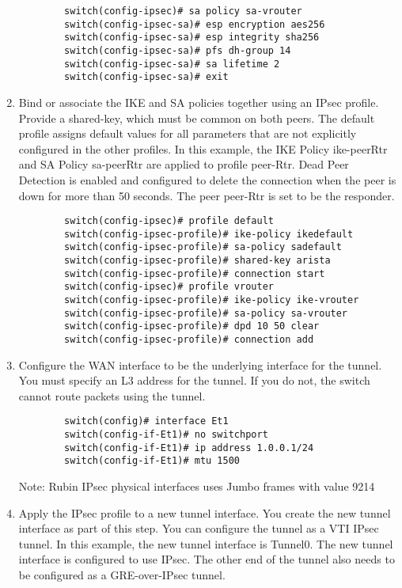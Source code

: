 \begin{enumerate}
        \begin{lstlisting}
        switch(config-ipsec)# sa policy sa-vrouter  
        switch(config-ipsec-sa)# esp encryption aes256  
        switch(config-ipsec-sa)# esp integrity sha256  
        switch(config-ipsec-sa)# pfs dh-group 14  
        switch(config-ipsec-sa)# sa lifetime 2  
        switch(config-ipsec-sa)# exit
        \end{lstlisting}
\item Bind or associate the IKE and SA policies together using an IPsec profile. Provide a shared-key, which must be common on both peers. The default profile assigns default values for all parameters that are not explicitly configured in the other profiles. In this example, the IKE Policy ike-peerRtr and SA Policy sa-peerRtr are applied to profile peer-Rtr. Dead Peer Detection is enabled and configured to delete the connection when the peer is down for more than 50 seconds. The peer peer-Rtr is set to be the responder.
        \begin{lstlisting}
        switch(config-ipsec)# profile default
        switch(config-ipsec-profile)# ike-policy ikedefault
        switch(config-ipsec-profile)# sa-policy sadefault
        switch(config-ipsec-profile)# shared-key arista
        switch(config-ipsec-profile)# connection start
        switch(config-ipsec)# profile vrouter
        switch(config-ipsec-profile)# ike-policy ike-vrouter
        switch(config-ipsec-profile)# sa-policy sa-vrouter
        switch(config-ipsec-profile)# dpd 10 50 clear
        switch(config-ipsec-profile)# connection add
        \end{lstlisting}
\item Configure the WAN interface to be the underlying interface for the tunnel. You must specify an L3 address for the tunnel. If you do not, the switch cannot route packets using the tunnel.
        \begin{lstlisting}
        switch(config)# interface Et1  
        switch(config-if-Et1)# no switchport  
        switch(config-if-Et1)# ip address 1.0.0.1/24  
        switch(config-if-Et1)# mtu 1500     
        \end{lstlisting}
    Note: Rubin IPsec physical interfaces uses Jumbo frames with value 9214
\item Apply the IPsec profile to a new tunnel interface. You create the new tunnel interface as part of this step. You can configure the tunnel as a VTI IPsec tunnel. In this example, the new tunnel interface is Tunnel0. The new tunnel interface is configured to use IPsec. The other end of the tunnel also needs to be configured as a GRE-over-IPsec tunnel.

\end{enumerate}
